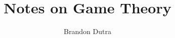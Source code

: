 \documentclass[12pt]{amsbook}
\theoremstyle{definition}
\numberwithin{section}{chapter}
\numberwithin{equation}{chapter}
\begin{document}
\frontmatter

\title{Notes on Game Theory}


\author{Brandon Dutra}
\address{Department of Mathematics, University of California, Davis}
\curraddr{}

\maketitle


	



\setcounter{page}{4}

\tableofcontents


\mainmatter






\end{document}
